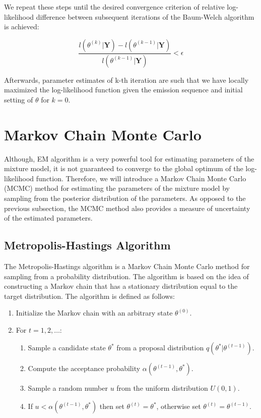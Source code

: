 We repeat these steps until the desired convergence criterion of relative log-likelihood difference between subsequent iterations of the Baum-Welch algorithm is achieved:

\begin{equation}
\frac{l(\theta^{(k)}|\textbf{Y}) - l(\theta^{(k-1)}|\textbf{Y})}{l(\theta^{(k-1)}|\textbf{Y})} < \epsilon
\end{equation}

Afterwards, parameter estimates of k-th iteration are such that we have locally maximized the log-likelihood function given the emission sequence 
and initial setting of $\theta$ for $k=0$. 

\section{Markov Chain Monte Carlo}

Although, EM algorithm is a very powerful tool for estimating parameters of the mixture model,
it is not guaranteed to converge to the global optimum of the log-likelihood function. Therefore, 
we will introduce a Markov Chain Monte Carlo (MCMC) method for estimating the parameters of the mixture model by 
sampling from the posterior distribution of the parameters. As opposed to the previous subsection, the MCMC method 
also provides a measure of uncertainty of the estimated parameters.     

\subsection{Metropolis-Hastings Algorithm}

The Metropolis-Hastings algorithm is a Markov Chain Monte Carlo method for sampling from a probability distribution. 
The algorithm is based on the idea of constructing a Markov chain that has a stationary distribution equal to the target distribution.
The algorithm is defined as follows:

\begin{enumerate}
    \item Initialize the Markov chain with an arbitrary state $\theta^{(0)}$.
    \item For $t = 1,2,\dots$:
    \begin{enumerate}
        \item Sample a candidate state $\theta^*$ from a proposal distribution $q(\theta^*|\theta^{(t-1)})$.
        \item Compute the acceptance probability $\alpha(\theta^{(t-1)},\theta^*)$.
        \item Sample a random number $u$ from the uniform distribution $U(0,1)$.
        \item If $u < \alpha(\theta^{(t-1)},\theta^*)$ then set $\theta^{(t)} = \theta^*$, otherwise set $\theta^{(t)} = \theta^{(t-1)}$.
    \end{enumerate}
\end{enumerate}

